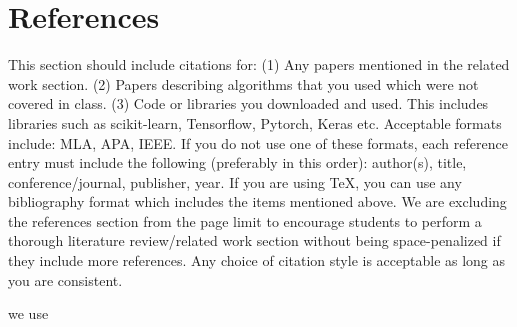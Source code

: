 \documentclass{article}
\begin{document}
\section*{References}
This section should include citations for: (1) Any papers mentioned in the related work
section. (2) Papers describing algorithms that you used which were not covered in class.
(3) Code or libraries you downloaded and used. This includes libraries such as scikit-learn, Tensorflow, Pytorch, Keras etc. Acceptable formats include: MLA, APA, IEEE. If you
do not use one of these formats, each reference entry must include the following (preferably
in this order): author(s), title, conference/journal, publisher, year. If you are using TeX,
you can use any bibliography format which includes the items mentioned above. We are excluding
the references section from the page limit to encourage students to perform a thorough
literature review/related work section without being space-penalized if they include more
references. Any choice of citation style is acceptable
as long as you are consistent. 

we use \cite{liu} \cite{shao} \cite{wei} \cite{hendrycks} \cite{cobbe}



\end{document}
